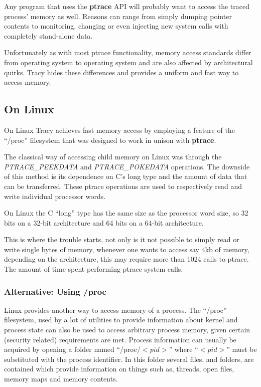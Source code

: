 \documentclass[a4paper, 10pt]{report}
\begin{document}
Any program that uses the \textbf{ptrace} API will probably want to access the
traced process' memory as well. Reasons can range from simply dumping pointer
contents to monitoring, changing or even injecting new system calls with
completely stand-alone data.

Unfortunately as with most ptrace functionality, memory access standards
differ from operating system to operating system and are also
affected by architectural quirks. Tracy hides these differences and
provides a uniform and fast way to access memory.

\subsection{On Linux}
On Linux Tracy achieves fast memory access by employing a feature of the
``/proc'' filesystem that was designed to work in unison with
\textbf{ptrace}.

The classical way of accessing child memory on Linux was through the
\textit{PTRACE\_PEEKDATA} and \textit{PTRACE\_POKEDATA} operations.
The downside of this method is its dependence on C's long type and the
amount of data that can be transferred.
These ptrace operations are used to respectively read and write individual
processor words.

On Linux the C ``long'' type has the same size as the
processor word size, so 32 bits on a 32-bit architecture and
64 bits on a 64-bit architecture.

This is where the trouble starts, not only is it not possible to simply read
or write single bytes of memory, whenever one wants to access say 4kb of
memory, depending on the architecture, this may require more than 1024
calls to ptrace. The amount of time spent performing ptrace system calls.

\subsubsection{Alternative: Using /proc}
Linux provides another way to access memory of a process. The ``/proc''
filesystem, used by a lot of utilities to provide information about kernel
and process state can also be used to access arbitrary process memory,
given certain (security related) requirements are met.
Process information can usually be acquired by opening a folder
named ``/proc/$<pid>$'' where ``$<pid>$'' must be substituted with the process
identifier. In this folder several files, and folders, are contained which
provide information on things such as, threads, open files, memory maps and
memory contents.
\end{document}
